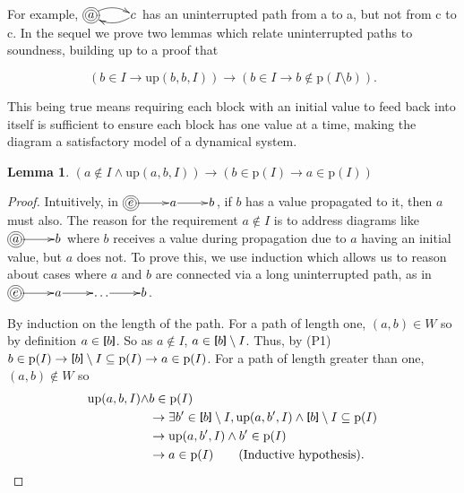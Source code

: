 \documentclass[twocolumn]{article}
\newtheorem{lemma}{Lemma}
\newcommand{\TightBracketB}[1]{\raisebox{0.25ex}{\scalebox{0.8}{\boldmath${#1\kern-0.65ex#1}$}}}%
\newcommand*{\Inputs}[1]{\TightBracketB[#1\TightBracketB]}
\begin{document}
For example, $\xymatrix@1{*++++[o][F=]{a} \ar@/^/[r] & c \ar@/^/[l]}$ has an uninterrupted path from a to a, but not from c to c. In the sequel we prove two lemmas which relate uninterrupted paths to soundness, building up to a proof that

\[
(b\in I \rightarrow \text{up}(b, b, I))
\rightarrow (b\in I\rightarrow b\not\in\text{p}(I\setminus b)).
\]

This being true means requiring each block with an initial value to feed back into itself is sufficient to ensure each block has one value at a time, making the diagram a satisfactory model of a dynamical system.

\begin{lemma} \label{lem:upp}
  $(a \not\in I \land \text{up}(a, b, I)) \rightarrow (b\in\text{p}(I) \rightarrow a\in\text{p}(I))$
\end{lemma}
\begin{proof}
    Intuitively, in $\xymatrix@1{*++++[o][F=]{e} \ar[r] & a \ar[r] & b}$, if $b$ has a value propagated to it, then $a$ must also. The reason for the requirement $a\not\in I$ is to address diagrams like $\xymatrix@1{*++++[o][F=]{a} \ar[r] & b}$ where $b$ receives a value during propagation due to $a$ having an initial value, but $a$ does not. To prove this, we use induction which allows us to reason about cases where $a$ and $b$ are connected via a long uninterrupted path, as in $\xymatrix@1{*++++[o][F=]{e} \ar[r] & a \ar[r] & \dots \ar[r] & b}$.

  By induction on the length of the path. For a path of length one, $(a, b)\in W$ so by definition $a\in\Inputs{b}$. So as $a\not\in I$, $a\in\Inputs{b}\setminus I$. Thus, by (P1) $b\in\text{p}(I)\rightarrow \Inputs{b}\setminus I\subseteq\text{p}(I)\rightarrow a\in\text{p}(I)$. For a path of length greater than one, $(a, b)\not\in W$ so
  \[
  \begin{aligned}
      \text{up}(a, b, I)\land &b\in\text{p}(I)  \\ 
      &\rightarrow \exists b'\in\Inputs{b}\setminus I, \text{up}(a, b', I) \land \Inputs{b}\setminus I\subseteq\text{p}(I) \\
      &\rightarrow \text{up}(a, b', I) \land b'\in\text{p}(I) \\
      &\rightarrow a\in\text{p}(I) \quad\quad\text{(Inductive hypothesis).}
  \end{aligned}
  \]
\end{proof}
\end{document}
